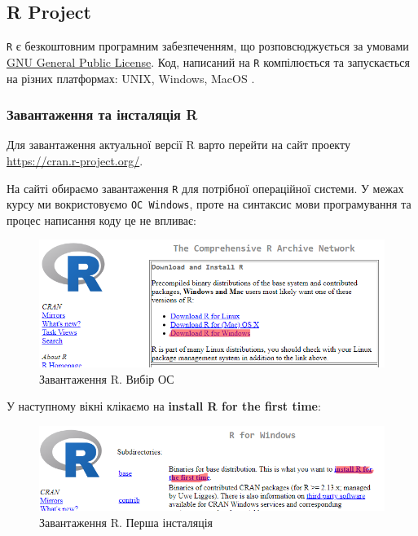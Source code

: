 \documentclass[
]{book}
\begin{document}
\hypertarget{chapter131}{%
\subsection{R Project}\label{chapter131}}

\texttt{R} є безкоштовним програмним забезпеченням, що розповсюджується за умовами \href{https://www.r-project.org/COPYING}{GNU General Public License}. Код, написаний на \texttt{R} компілюється та запускається на різних платформах: UNIX, Windows, MacOS \citep{R-base}.

\hypertarget{chapter1311}{%
\subsubsection{Завантаження та інсталяція R}\label{chapter1311}}

Для завантаження актуальної версії R варто перейти на сайт проекту \url{https://cran.r-project.org/}.

На сайті обираємо завантаження \texttt{R} для потрібної операційної системи. У межах курсу ми вокристовуємо \texttt{ОС\ Windows}, проте на синтаксис мови програмування та процес написання коду це не впливає:

\begin{figure}
\includegraphics[width=10.15in]{images/chapter1/r_gui_1} \caption{Завантаження R. Вибір ОС}\label{fig:unnamed-chunk-1}
\end{figure}

У наступному вікні клікаємо на \textbf{install R for the first time}:

\begin{figure}
\includegraphics[width=10.32in]{images/chapter1/r_gui_2} \caption{Завантаження R. Перша інсталяція}\label{fig:unnamed-chunk-2}
\end{figure}
\end{document}
